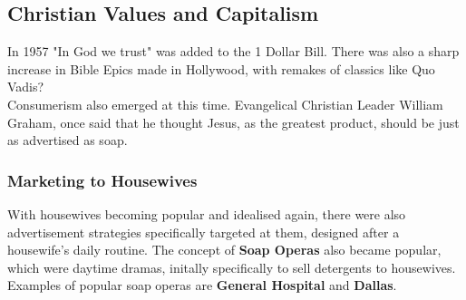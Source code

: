 \documentclass{article}
\begin{document}
	\subsection{Christian Values and Capitalism}
	In 1957 "In God we trust" was added to the 1 Dollar Bill. There was also a sharp increase in Bible Epics made in Hollywood, with remakes of classics like Quo Vadis? \\
	Consumerism also emerged at this time. Evangelical Christian Leader William Graham, once said that he thought Jesus, as the greatest product, should be just as advertised as soap. \\
	\subsubsection{Marketing to Housewives}
	With housewives becoming popular and idealised again, there were also advertisement strategies specifically targeted at them, designed after a housewife's daily routine. The concept of \textbf{Soap Operas} also became popular, which were daytime dramas, initally specifically to sell detergents to housewives. \\
	Examples of popular soap operas are \textbf{General Hospital} and \textbf{Dallas}. \\
\end{document}
